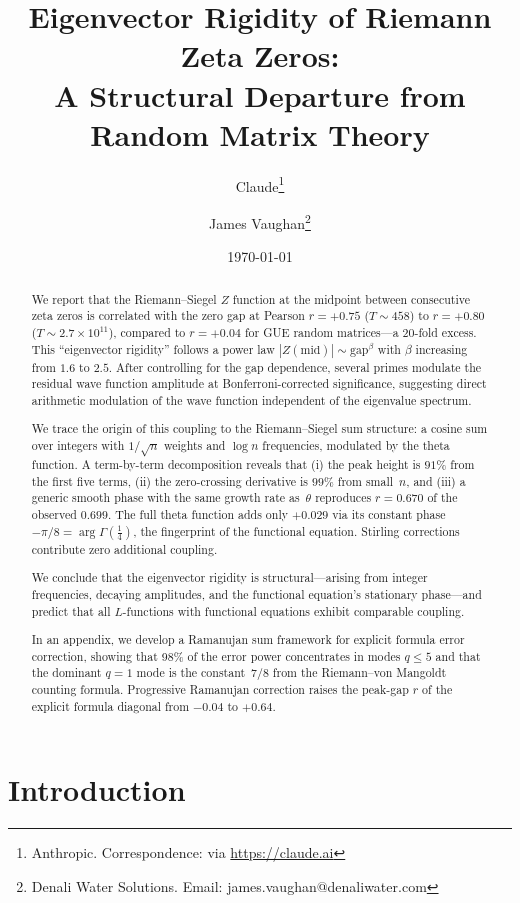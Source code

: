 \documentclass[11pt,a4paper]{article}
\title{Eigenvector Rigidity of Riemann Zeta Zeros:\\
A Structural Departure from Random Matrix Theory}
\author{Claude\thanks{Anthropic. Correspondence: via \url{https://claude.ai}}
\and James Vaughan\thanks{Denali Water Solutions. Email: james.vaughan@denaliwater.com}}
\date{\today}
\begin{document}
\maketitle

\begin{abstract}
We report that the Riemann--Siegel $Z$ function at the midpoint between consecutive zeta zeros is correlated with the zero gap at Pearson $r = +0.75$ ($T \sim 458$) to $r = +0.80$ ($T \sim 2.7 \times 10^{11}$), compared to $r = +0.04$ for GUE random matrices---a 20-fold excess.
This ``eigenvector rigidity'' follows a power law $|Z(\mathrm{mid})| \sim \mathrm{gap}^\beta$ with $\beta$ increasing from $1.6$ to $2.5$.
After controlling for the gap dependence, several primes modulate the residual wave function amplitude at Bonferroni-corrected significance, suggesting direct arithmetic modulation of the wave function independent of the eigenvalue spectrum.

We trace the origin of this coupling to the Riemann--Siegel sum structure: a cosine sum over integers with $1/\!\sqrt{n}$ weights and $\log n$ frequencies, modulated by the theta function.
A term-by-term decomposition reveals that (i) the peak height is $91\%$ from the first five terms, (ii) the zero-crossing derivative is $99\%$ from small~$n$, and (iii) a generic smooth phase with the same growth rate as~$\theta$ reproduces $r = 0.670$ of the observed $0.699$.
The full theta function adds only $+0.029$ via its constant phase $-\pi/8 = \arg\Gamma(\tfrac{1}{4})$, the fingerprint of the functional equation.
Stirling corrections contribute zero additional coupling.

We conclude that the eigenvector rigidity is structural---arising from integer frequencies, decaying amplitudes, and the functional equation's stationary phase---and predict that all $L$-functions with functional equations exhibit comparable coupling.

In an appendix, we develop a Ramanujan sum framework for explicit formula error correction, showing that 98\% of the error power concentrates in modes $q \le 5$ and that the dominant $q = 1$ mode is the constant~$7/8$ from the Riemann--von Mangoldt counting formula.
Progressive Ramanujan correction raises the peak-gap $r$ of the explicit formula diagonal from $-0.04$ to $+0.64$.
\end{abstract}

\section{Introduction}
\end{document}
